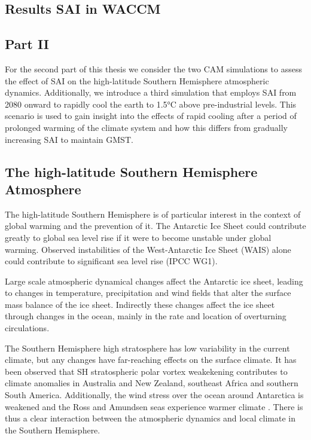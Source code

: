 \subsection{Results SAI in WACCM}


\subsection*{Part II}
For the second part of this thesis we consider the two CAM simulations to assess the effect of SAI on the high-latitude Southern Hemisphere atmospheric dynamics. Additionally, we introduce a third simulation that employs SAI from 2080 onward to rapidly cool the earth to 1.5°C above pre-industrial levels. This scenario is used to gain insight into the effects of rapid cooling after a period of prolonged warming of the climate system and how this differs from gradually increasing SAI to maintain GMST.

\subsection{The high-latitude Southern Hemisphere Atmosphere}
The high-latitude Southern Hemisphere is of particular interest in the context of global warming and the prevention of it. The Antarctic Ice Sheet could contribute greatly to global sea level rise if it were to become unstable under global warming. Observed instabilities of the West-Antarctic Ice Sheet (WAIS) alone could contribute to significant sea level rise (IPCC WG1). 

Large scale atmospheric dynamical changes affect the Antarctic ice sheet, leading to changes in temperature, precipitation and wind fields that alter the surface mass balance of the ice sheet. Indirectly these changes affect the ice sheet through changes in the ocean, mainly in the rate and location of overturning circulations.

The Southern Hemisphere high stratosphere has low variability in the current climate, but any changes have far-reaching effects on the surface climate. It has been observed that SH stratospheric polar vortex weakekening contributes to climate anomalies in Australia and New Zealand, southeast Africa and southern South America. Additionally, the wind stress over the ocean around Antarctica is weakened and the Ross and Amundsen seas experience warmer climate \parencite{domeisen2020}. There is thus a clear interaction between the atmospheric dynamics and local climate in the Southern Hemisphere. 



